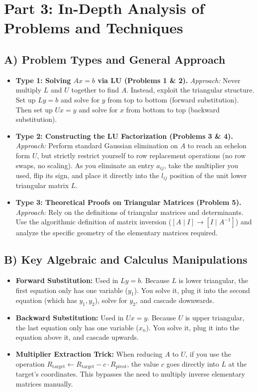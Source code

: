 \documentclass[11pt]{article}
\begin{document}
\newpage
\section{Part 3: In-Depth Analysis of Problems and Techniques}

\subsection{A) Problem Types and General Approach}
\begin{itemize}
    \item \textbf{Type 1: Solving $Ax=b$ via LU (Problems 1 \& 2).}
    \textit{Approach:} Never multiply $L$ and $U$ together to find $A$. Instead, exploit the triangular structure. Set up $Ly = b$ and solve for $y$ from top to bottom (forward substitution). Then set up $Ux = y$ and solve for $x$ from bottom to top (backward substitution).
    
    \item \textbf{Type 2: Constructing the LU Factorization (Problems 3 \& 4).}
    \textit{Approach:} Perform standard Gaussian elimination on $A$ to reach an echelon form $U$, but strictly restrict yourself to row replacement operations (no row swaps, no scaling). As you eliminate an entry $a_{ij}$, take the multiplier you used, flip its sign, and place it directly into the $l_{ij}$ position of the unit lower triangular matrix $L$.
    
    \item \textbf{Type 3: Theoretical Proofs on Triangular Matrices (Problem 5).}
    \textit{Approach:} Rely on the definitions of triangular matrices and determinants. Use the algorithmic definition of matrix inversion ($[A \mid I] \to [I \mid A^{-1}]$) and analyze the specific geometry of the elementary matrices required.
\end{itemize}

\subsection{B) Key Algebraic and Calculus Manipulations}
\begin{itemize}
    \item \textbf{Forward Substitution:} Used in $Ly=b$. Because $L$ is lower triangular, the first equation only has one variable ($y_1$). You solve it, plug it into the second equation (which has $y_1, y_2$), solve for $y_2$, and cascade downwards.
    \item \textbf{Backward Substitution:} Used in $Ux=y$. Because $U$ is upper triangular, the last equation only has one variable ($x_n$). You solve it, plug it into the equation above it, and cascade upwards.
    \item \textbf{Multiplier Extraction Trick:} When reducing $A$ to $U$, if you use the operation $R_{\text{target}} \leftarrow R_{\text{target}} - c \cdot R_{\text{pivot}}$, the value $c$ goes directly into $L$ at the target's coordinates. This bypasses the need to multiply inverse elementary matrices manually.
\end{itemize}
\end{document}
